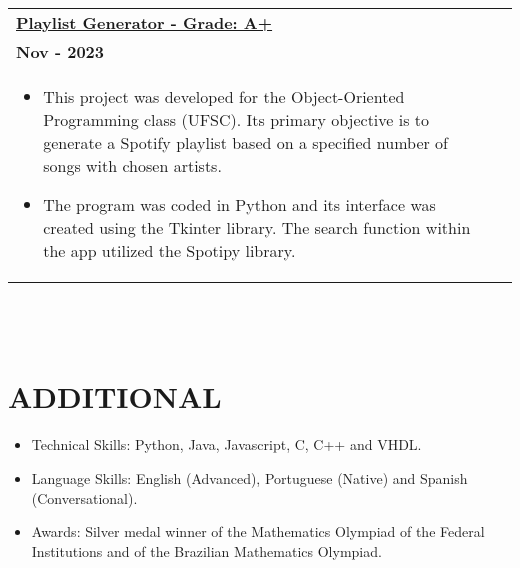 \documentclass[a4paper,8pt]{article}
\begin{document}
\begin{tabularx}{\linewidth}{ @{}l r@{} }
\textbf{\href{https://github.com/leonardosm14/Playlist-Generator}{Playlist Generator - Grade: A+}} \\[4pt]
\textbf{Nov - 2023} \\[4pt]
\begin{minipage}[t]{\linewidth}
    \begin{itemize}[nosep,after=\strut, leftmargin=1em, itemsep=2pt]
        \item This project was developed for the Object-Oriented Programming class (UFSC). Its primary objective is to generate a Spotify playlist based on a specified number of songs with chosen artists.
        \item The program was coded in Python and its interface was created using the Tkinter library. The search function within the app utilized the Spotipy library.
    \end{itemize}
\end{minipage}
\end{tabularx}
\\

\\
\section{\textbf{ADDITIONAL}}
\begin{minipage}[t]{\linewidth}
    \begin{itemize}[nosep,after=\strut, leftmargin=1em, itemsep=2pt]
        \item Technical Skills: Python, Java, Javascript, C, C++ and VHDL.
        \item Language Skills: English (Advanced), Portuguese 
        (Native) and Spanish (Conversational).
        \item Awards: Silver medal winner of the Mathematics Olympiad of the Federal Institutions and of the Brazilian Mathematics Olympiad.
    \end{itemize}
\end{minipage}
\end{document}
